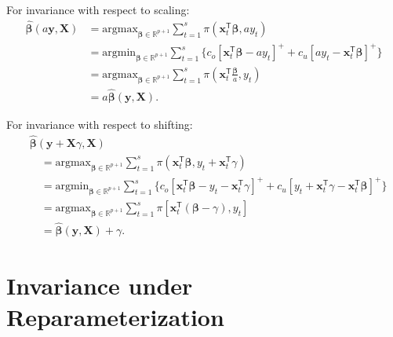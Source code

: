 \documentclass{article}
\begin{document}
For invariance with respect to scaling:
\[
    \begin{aligned}
        \hat{\boldsymbol{\beta}}(a\mathbf{y},\mathbf{X})
        &=\text{argmax}_{\boldsymbol{\beta}\in \mathbb{R}^{p+1}}\displaystyle\sum_{t=1}^s{\pi(\mathbf{x}_t^{\mathsf{T}}\boldsymbol{\beta},ay_t)}\\
        &=\text{argmin}_{\boldsymbol{\beta}\in \mathbb{R}^{p+1}}\displaystyle\sum_{t=1}^s{\{c_o[\mathbf{x}_t^{\mathsf{T}}\boldsymbol{\beta}-ay_t]^{+}+c_u[ay_t-\mathbf{x}_t^{\mathsf{T}}\boldsymbol{\beta}]^{+}\}}\\
        &=\text{argmax}_{\boldsymbol{\beta}\in \mathbb{R}^{p+1}}\displaystyle\sum_{t=1}^s{\pi\left(\mathbf{x}_t^{\mathsf{T}}\frac{\boldsymbol{\beta}}{a},y_t\right)}\\
        &=a\hat{\boldsymbol{\beta}}(\mathbf{y},\mathbf{X}).
    \end{aligned}
\]

\noindent
For invariance with respect to shifting:
\[
    \begin{aligned}
        &\hat{\boldsymbol{\beta}}(\mathbf{y}+\mathbf{X}\gamma,\mathbf{X})\\
        &\quad=\text{argmax}_{\boldsymbol{\beta}\in \mathbb{R}^{p+1}}\displaystyle\sum_{t=1}^s{\pi(\mathbf{x}_t^{\mathsf{T}}\boldsymbol{\beta},y_t+\mathbf{x}_t^{\mathsf{T}}\gamma)}\\
        &\quad=\text{argmin}_{\boldsymbol{\beta}\in \mathbb{R}^{p+1}}\displaystyle\sum_{t=1}^s{\{c_o[\mathbf{x}_t^{\mathsf{T}}\boldsymbol{\beta}-y_t-\mathbf{x}_t^{\mathsf{T}}\gamma]^{+}+c_u[y_t+\mathbf{x}_t^{\mathsf{T}}\gamma-\mathbf{x}_t^{\mathsf{T}}\boldsymbol{\beta}]^{+}\}}\\
        &\quad=\text{argmax}_{\boldsymbol{\beta}\in \mathbb{R}^{p+1}}\displaystyle\sum_{t=1}^s{\pi[\mathbf{x}_t^{\mathsf{T}}(\boldsymbol{\beta}-\gamma),y_t]}\\
        &\quad=\hat{\boldsymbol{\beta}}(\mathbf{y},\mathbf{X})+\gamma.
    \end{aligned}
\]

\section{Invariance under Reparameterization}
\label{app:B}
\end{document}

